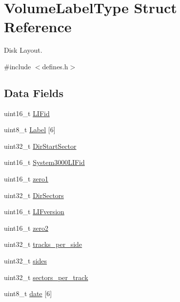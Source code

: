 \hypertarget{structVolumeLabelType}{}\section{Volume\+Label\+Type Struct Reference}
\label{structVolumeLabelType}


Disk Layout.  




{\ttfamily \#include $<$defines.\+h$>$}

\subsection*{Data Fields}
\begin{DoxyCompactItemize}
\item 
uint16\+\_\+t \hyperlink{structVolumeLabelType_a16bdde2d19114ac3238477c29fe75b4a}{L\+I\+Fid}
\item 
uint8\+\_\+t \hyperlink{structVolumeLabelType_ad8724768576a8eb4d697597ae9b90c21}{Label} \mbox{[}6\mbox{]}
\item 
uint32\+\_\+t \hyperlink{structVolumeLabelType_aa74d0d5a4d248e42b2eb2fb95dcad4a6}{Dir\+Start\+Sector}
\item 
uint16\+\_\+t \hyperlink{structVolumeLabelType_a08ea76c4d6e860804d6cfd24174d301f}{System3000\+L\+I\+Fid}
\item 
uint16\+\_\+t \hyperlink{structVolumeLabelType_a741f3741367c9c73ba24d15ac0b0e3a4}{zero1}
\item 
uint32\+\_\+t \hyperlink{structVolumeLabelType_a11e35931a035c61cddc1fa20898e9466}{Dir\+Sectors}
\item 
uint16\+\_\+t \hyperlink{structVolumeLabelType_a2aba13e38e43a590f909ab94d74a74ff}{L\+I\+Fversion}
\item 
uint16\+\_\+t \hyperlink{structVolumeLabelType_a18c623a319ca760c0ad57ff96346e54f}{zero2}
\item 
uint32\+\_\+t \hyperlink{structVolumeLabelType_a590051c8debbe3d157761235c0e80d79}{tracks\+\_\+per\+\_\+side}
\item 
uint32\+\_\+t \hyperlink{structVolumeLabelType_ac1e0f088685c022ec1974cb6fa4d255c}{sides}
\item 
uint32\+\_\+t \hyperlink{structVolumeLabelType_a0014a4795dfcf4117212bba590fc889e}{sectors\+\_\+per\+\_\+track}
\item 
uint8\+\_\+t \hyperlink{structVolumeLabelType_afd5885a37ea57ff74409f8c62a55bd1a}{date} \mbox{[}6\mbox{]}
\end{DoxyCompactItemize}


